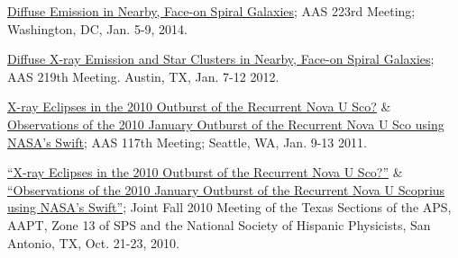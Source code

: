 \documentclass[letter,12pt]{article}
\begin{document}
\begin{etaremune}
\item \href{http://adsabs.harvard.edu/abs/2014AAS...22345311S}{Diffuse Emission in Nearby, Face-on Spiral Galaxies}; AAS 223rd Meeting;
Washington, DC, Jan. 5-9, 2014.

\item \href{http://adsabs.harvard.edu/abs/2012AAS...21934630V}{Diffuse X-ray Emission and Star Clusters in Nearby, Face-on Spiral Galaxies}; AAS 219th Meeting. Austin, TX, Jan. 7-12 2012.

\item \href{http://adsabs.harvard.edu/abs/2011AAS...21733813M}{X-ray Eclipses in the 2010 Outburst of the Recurrent Nova U Sco?} \& \href{http://adsabs.harvard.edu/abs/2011AAS...21733812M}{Observations of the 2010 January Outburst of the Recurrent Nova U Sco using NASA's Swift}; AAS 117th Meeting;
Seattle, WA, Jan. 9-13 2011. 






\item \href{http://adsabs.harvard.edu/abs/2010APS..TSFFP1019V}{“X-ray Eclipses in the 2010 Outburst of the Recurrent Nova U Sco?”} \&  \href{http://adsabs.harvard.edu/abs/2010APS..TSFFP1013M}{“Observations of the 2010 January Outburst of the Recurrent Nova U Scoprius using NASA's Swift”}; Joint Fall 2010 Meeting of the Texas Sections of the APS, AAPT, Zone 13 of SPS and the National Society of Hispanic Physicists, San Antonio, TX, Oct. 21-23, 2010.

\end{etaremune}
\end{document}
